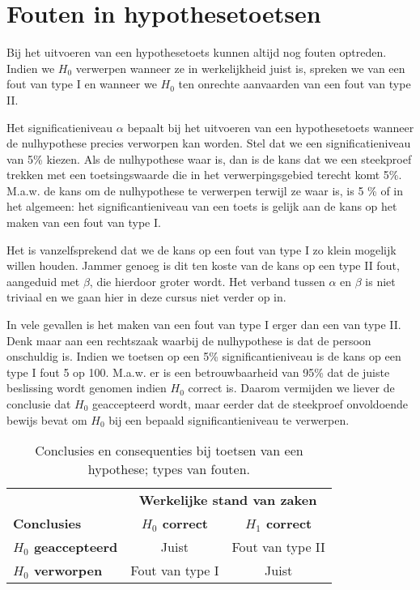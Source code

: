 
\section{Fouten in hypothesetoetsen}

Bij het uitvoeren van een hypothesetoets kunnen altijd nog fouten optreden. Indien we $H_{0}$ verwerpen wanneer ze in werkelijkheid juist is, spreken we van een fout van type I en wanneer we $H_{0}$ ten onrechte aanvaarden van een fout van type II.

Het significatieniveau $\alpha$ bepaalt bij het uitvoeren van een hypothesetoets wanneer de nulhypothese precies verworpen kan worden. Stel dat we een significatieniveau van 5\% kiezen. Als de nulhypothese waar is, dan is de kans dat we een steekproef trekken met een toetsingswaarde die in het verwerpingsgebied terecht komt 5\%. M.a.w. de kans om de nulhypothese te verwerpen terwijl ze waar is, is 5 \% of in het algemeen: het significantieniveau van een toets is gelijk aan de kans op het maken van een fout van type I.

Het is vanzelfsprekend dat we de kans op een fout van type I zo klein mogelijk willen houden. Jammer genoeg is dit ten koste van de kans op een type II fout, aangeduid met $\beta$, die hierdoor groter wordt. Het verband tussen $\alpha$ en $\beta$ is niet triviaal en we gaan hier in deze cursus niet verder op in.

In vele gevallen is het maken van een fout van type I erger dan een van type II. Denk maar aan een rechtszaak waarbij de nulhypothese is dat de persoon onschuldig is. Indien we toetsen op een 5\% significantieniveau is de kans op een type I fout 5 op 100. M.a.w. er is een betrouwbaarheid van 95\% dat de juiste beslissing wordt genomen indien $H_{0}$ correct is. Daarom vermijden we liever de conclusie dat $H_{0}$ geaccepteerd wordt, maar eerder dat de steekproef onvoldoende bewijs bevat om $H_{0}$ bij een bepaald significantieniveau te verwerpen.

\begin{table}
  \centering
  \begin{tabular}{@{}l|cc@{}}
    \toprule
    & \multicolumn{2}{c}{\textbf{Werkelijke stand van zaken}} \\
    \textbf{Conclusies}          & \textbf{$H_{0}$ correct} & \textbf{$H_{1}$ correct}     \\
    \midrule
    \textbf{$H_{0}$ geaccepteerd}& Juist                    & Fout van type II \\
    \textbf{$H_{0}$ verworpen}   & Fout van type I          & Juist            \\
    \bottomrule
  \end{tabular}
  \caption{Conclusies en consequenties bij toetsen van een hypothese; types van fouten.}
  \label{tab:hypfouten}
\end{table}

